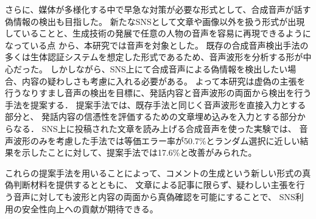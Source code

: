 さらに、媒体が多様化する中で早急な対策が必要な形式として、合成音声が話す偽情報の検出も目指した。
新たなSNSとして文章や画像以外を扱う形式が出現していることと、生成技術の発展で任意の人物の音声を容易に再現できるようになっている点
から、本研究では音声を対象とした。
既存の合成音声検出手法の多くは生体認証システムを想定した形式であるため、音声波形を分析する形が中心だった。
しかしながら、SNS上にて合成音声による偽情報を検出したい場合、内容の疑わしさも考慮に入れる必要がある。
よって本研究は虚偽の主張を行うなりすまし音声の検出を目標に、発話内容と音声波形の両面から検出を行う手法を提案する．
提案手法では、既存手法と同じく音声波形を直接入力とする部分と、
発話内容の信憑性を評価するための文章埋め込みを入力とする部分からなる．
SNS上に投稿された文章を読み上げる合成音声を使った実験では、
音声波形のみを考慮した手法では等価エラー率が50.7\%とランダム選択に近しい結果を示したことに対して、提案手法では17.6\%と改善がみられた。

これらの提案手法を用いることによって、コメントの生成という新しい形式の真偽判断材料を提供するとともに、
文章による記事に限らず、疑わしい主張を行う音声に対しても波形と内容の両面から真偽確認を可能にすることで、
SNS利用の安全性向上への貢献が期待できる。

%

\cleardoublepage